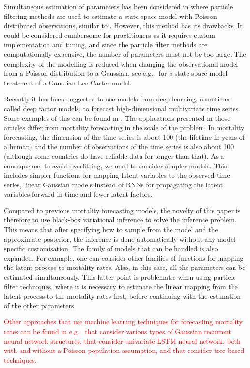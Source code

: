 \documentclass[11pt]{article}
\begin{document}
Simultaneous estimation of parameters has been considered in \cite{andersson2020mortality} where particle filtering methods are used to estimate a state-space model with Poisson distributed observations, similar to \cite{brouhns2002poisson}. However, this method has its drawbacks. It could be considered cumbersome for practitioners as it requires custom implementation and tuning, and since the particle filter methods are computationally expensive, the number of parameters must not be too large. The complexity of the modelling is reduced when changing the observational model from a Poisson distribution to a Gaussian, see e.g.\ \cite{de2006extending} for a state-space model treatment of a Gaussian Lee-Carter model.

Recently it has been suggested to use models from deep learning, sometimes called deep factor models, to forecast high-dimensional multivariate time series. Some examples of this can be found in \cite{nguyen2021temporal, wang2019deep, salinas2020deepar, rangapuram2018deep}. The applications presented in those articles differ from mortality forecasting in the scale of the problem. In mortality forecasting, the dimension of the time series is about 100 (the lifetime in years of a human) and the number of observations of the time series is also about 100 (although some countries do have reliable data for longer than that). As a consequence, to avoid overfitting, we need to consider simpler models. This includes simpler functions for mapping latent variables to the observed time series, linear Gaussian models instead of RNNs for propagating the latent variables forward in time and fewer latent factors.

Compared to previous mortality forecasting models, the novelty of this paper is therefore to use black-box variational inference \citep{ranganath2014black} to solve the inference problem. This means that after specifying how to sample from the model and the approximate posterior, the inference is done automatically without any model-specific customisation. The family of models that can be handled is also expanded. For example, one can consider other families of functions for mapping the latent process to mortality rates. Also, in this case, all the parameters can be estimated simultaneously. This latter point is problematic when using particle filter techniques, where it is necessary to estimate the linear mapping from the latent process to the mortality rates first, before continuing with the estimation of the other parameters.

\textcolor{red}{Other approaches that use machine learning techniques for forecasting mortality rates can be found in e.g.\ \cite{richman2019lee,richman2021neural,perla2021time} that consider various types of Gaussian recurrent neural network structures, \cite{nigri2019deep,marino2020measuring,lindholm2022efficient} that consider univariate LSTM neural network, both with and without a Poisson population assumption, and \cite{deprez2017machine} that consider tree-based techniques.}
\end{document}
